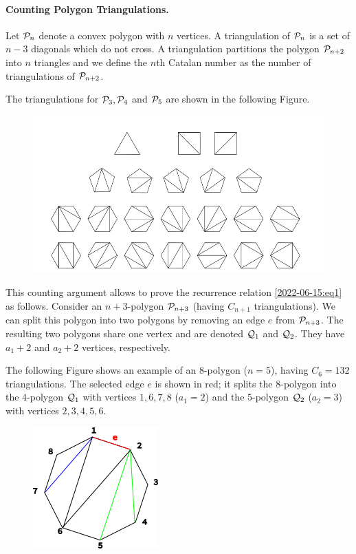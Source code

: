 \paragraph{Counting Polygon Triangulations.} Let $\mathcal{P}_n$ denote a convex polygon with $n$ vertices. A triangulation of $\mathcal{P}_n$ is a set of $n-3$ diagonals which do not cross. A triangulation partitions the polygon $\mathcal{P}_{n+2}$ into $n$ triangles and we define the $n$th Catalan number as the number of triangulations of $\mathcal{P}_{n+2}$.

The triangulations for $\mathcal{P}_3, \mathcal{P}_4$ and $\mathcal{P}_5$ are shown in the following Figure.

\begin{figure}[H]
\centering
\includegraphics[scale=0.5]{images/2022-06-15-catalan_01.png}
\end{figure}

This counting argument allows to prove the recurrence relation \eqref{2022-06-15:eq1} as follows. Consider an $n+3$-polygon $\mathcal{P}_{n+3}$ (having $C_{n+1}$ triangulations). We can split this polygon into two polygons by removing an edge $e$ from $\mathcal{P}_{n+3}$. The resulting two polygons share one vertex and are denoted $\mathcal{Q}_1$ and $\mathcal{Q}_2$. They have $a_1+2$ and $a_2+2$ vertices, respectively. 

The following Figure shows an example of an $8$-polygon ($n=5$), having $C_6 = 132$ triangulations. The selected edge $e$ is shown in red; it splits the $8$-polygon into the $4$-polygon $\mathcal{Q}_1$ with vertices $1,6,7,8$ ($a_1=2$) and the $5$-polygon $\mathcal{Q}_2$ ($a_2=3$) with vertices $2,3,4,5,6$.

\begin{figure}[H]
\centering
\includegraphics[scale=1.0]{images/2022-06-15-catalan_02.png}
\end{figure}

